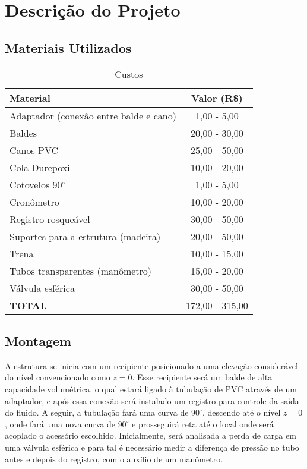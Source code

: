 \chapter{Descrição do Projeto}\label{descricao}

\section{Materiais Utilizados}

 \begin{table}[H]\label{t:custos}
     \centering
     \begin{tabular}{l c }
         \toprule
         \textbf{Material} & \textbf{Valor (R\$)} \\
         \midrule
         Adaptador (conexão entre balde e cano) & 1,00 - 5,00 \\
         Baldes & 20,00 - 30,00 \\
         Canos PVC & 25,00 - 50,00 \\
         Cola Durepoxi & 10,00 - 20,00 \\
         Cotovelos 90$^\circ$ & 1,00 - 5,00\\
         Cronômetro & 10,00 - 20,00 \\
         Registro rosqueável & 30,00 - 50,00 \\
         Suportes para a estrutura (madeira) & 20,00 - 50,00 \\
         Trena & 10,00 - 15,00 \\
         Tubos transparentes (manômetro) & 15,00 - 20,00 \\
         Válvula esférica & 30,00 - 50,00 \\
         \midrule
         \textbf{TOTAL} & 172,00 - 315,00\\
         \bottomrule
     \end{tabular}
     \caption{Custos}
 \end{table}

\section{Montagem}

A estrutura se inicia com um recipiente posicionado a uma elevação 
considerável do nível convencionado como $z = 0$. Esse
recipiente será um balde de alta capacidade volumétrica, o qual estará ligado 
à tubulação de PVC através de um
adaptador, e após essa conexão será instalado um registro para controle da 
saída do fluido. A seguir, a tubulação fará
uma curva de $90^\circ$, descendo até o nível $z = 0$, 
onde fará uma nova curva de $90^\circ$
e prosseguirá reta até o local onde será
acoplado o acessório escolhido. Inicialmente, será analisada a perda de carga 
em uma válvula esférica e para tal é
necessário medir a diferença de pressão no tubo antes e depois do 
registro, com o auxílio de um manômetro.

